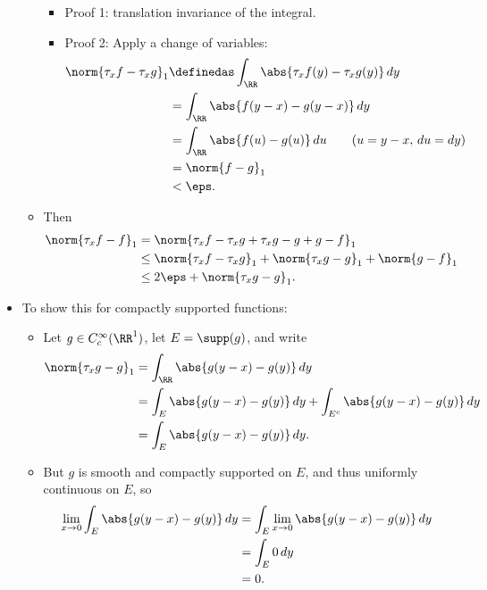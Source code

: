 \begin{solution}
\begin{itemize}
\begin{itemize}
    \begin{itemize}
    \tightlist
    \item
      Proof 1: translation invariance of the integral.
    \item
      Proof 2: Apply a change of variables:
      \begin{align*}  
      \norm{\tau_x f - \tau_x g}_1
      &\definedas \int_\RR \abs{\tau_x f(y) - \tau_x g(y)}\, dy \\
      &= \int_\RR \abs{f(y-x) - g(y-x)}\, dy  \\
      &= \int_\RR \abs{f(u) - g(u)}\, du \qquad (u=y-x,\, du=dy) \\
      &= \norm{f-g}_1 \\
      &< \eps
      .\end{align*}
    \end{itemize}
  \item
    Then
    \begin{align*}  
    \norm{\tau_x f - f}_1 
    &= \norm{\tau_x f - \tau_x g + \tau_x g - g +g - f}_{1} \\
    &\leq \norm{\tau_x f - \tau_x g}_1 + \norm{\tau_x g - g}_1 + \norm{g - f}_{1} \\
    &\leq 2\eps + \norm{\tau_x g - g}_1
    .\end{align*}
  \end{itemize}
\item
  To show this for compactly supported functions:

  \begin{itemize}
  \item
    Let \(g\in C_c^\infty(\RR^1)\), let \(E = \supp(g)\), and write
    \begin{align*}  
    \norm{\tau_x g - g}_1 
    &= \int_\RR \abs{g(y-x) - g(y)}\,dy \\
    &= \int_E \abs{g(y-x) - g(y)} \,dy + \int_{E^c} \abs{g(y-x) - g(y)} \,dy\\
    &= \int_E \abs{g(y-x) - g(y)} \,dy 
    .\end{align*}
  \item
    But \(g\) is smooth and compactly supported on \(E\), and thus
    uniformly continuous on \(E\), so
    \begin{align*}  
    \lim_{x\to 0} \int_E \abs{g(y-x) - g(y)} \,dy 
    &= \int_E \lim_{x\to 0} \abs{g(y-x) - g(y)} \,dy \\
    &= \int_E 0 \,dy \\
    &= 0
    .\end{align*}
  \end{itemize}
\end{itemize}

\end{solution}

